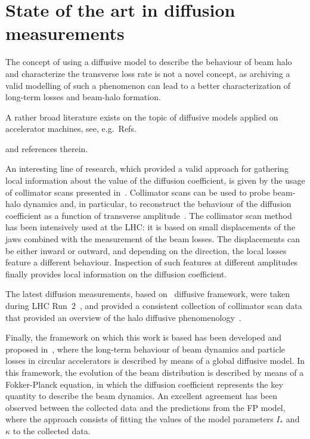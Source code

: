 \section{State of the art in diffusion measurements}

The concept of using a diffusive model to describe the behaviour of beam halo and characterize the transverse loss rate is not a novel concept, as archiving a valid modelling of such a phenomenon can lead to a better characterization of long-term losses and beam-halo formation.

A rather broad literature exists on the topic of diffusive models applied on accelerator machines, see, e.g.\ Refs.~{\cite{Burnod:205343,Meddahi:223301,PhysRevLett.68.33,gerasimov1992applicability,zimmermann1994transverse,PhysRevLett.77.1051,PhysRevSTAB.5.074001,flilleriii:pac03-rpag004} and references therein. %

An interesting line of research, which provided a valid approach for gathering local information about the value of the diffusion coefficient, is given by the usage of collimator scans presented in~\cite{MESS1994279}. Collimator scans can be used to probe beam-halo dynamics and, in particular, to reconstruct the behaviour of the diffusion coefficient as a function of transverse amplitude~\cite{stancari2011diffusion,PhysRevSTAB.16.021003,PhysRevAccelBeams.23.044802}. The collimator scan method has been intensively used at the LHC: it is based on small displacements of the jaws combined with the measurement of the beam losses. The displacements can be either inward or outward, and depending on the direction, the local losses feature a different behaviour. Inspection of such features at different amplitudes finally provides local information on the diffusion coefficient.

The latest diffusion measurements, based on~\cite{stancari2011diffusion} diffusive framework, were taken during LHC Run~2~\cite{Valentino:2280928}, and provided a consistent collection of collimator scan data that provided an overview of the halo diffusive phenomenology~\cite{PhysRevAccelBeams.23.044802}.  

Finally, the framework on which this work is based has been developed and proposed in~\cite{Bazzani:2019lse,bazzani2020diffusion}, where the long-term behaviour of beam dynamics and particle losses in circular accelerators is described by means of a global diffusive model. In this framework, the evolution of the beam distribution is described by means of a Fokker-Planck equation, in which the diffusion coefficient represents the key quantity to describe the beam dynamics. An excellent agreement has been observed between the collected data and the predictions from the FP model, where the approach consists of fitting the values of the model parameters $I_\ast$ and $\kappa$ to the collected data.


}
